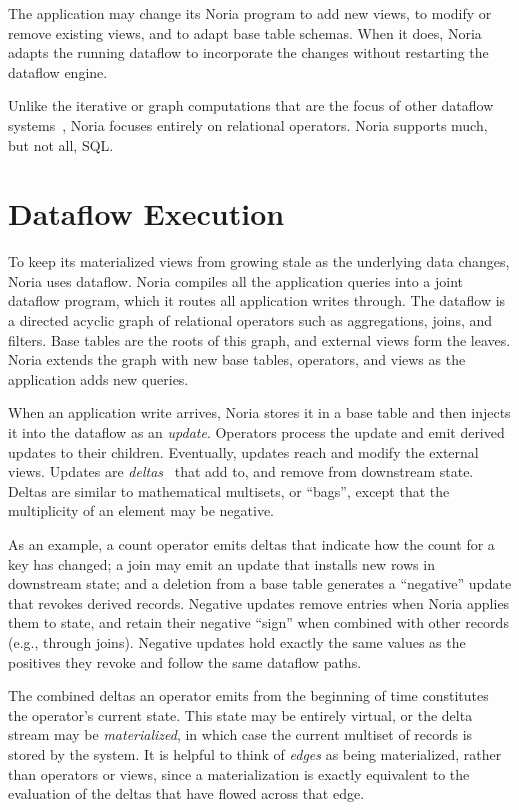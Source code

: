 The application may change its Noria program to add new views, to modify or
remove existing views, and to adapt base table schemas. When it does, Noria
adapts the running dataflow to incorporate the changes without restarting the
dataflow engine.

Unlike the iterative or graph computations that are the focus of other dataflow
systems~\cite{naiad, differential-dataflow}, Noria focuses entirely on
relational operators. Noria supports much, but not all, SQL.

\section{Dataflow Execution}

To keep its materialized views from growing stale as the underlying data
changes, Noria uses dataflow. Noria compiles all the application queries into a
joint dataflow program, which it routes all application writes through. The
dataflow is a directed acyclic graph of relational operators such as
aggregations, joins, and filters. Base tables are the roots of this graph, and
external views form the leaves. Noria extends the graph with new base tables,
operators, and views as the application adds new queries.

When an application write arrives, Noria stores it in a base table and then
injects it into the dataflow as an \emph{update}. Operators process the update
and emit derived updates to their children. Eventually, updates reach and modify
the external views. Updates are \emph{deltas}~\cite{roll, differential-dataflow}
that add to, and remove from downstream state. Deltas are similar to
mathematical multisets, or ``bags'', except that the multiplicity of an element
may be negative.

As an example, a count operator emits deltas that indicate how the count for a
key has changed; a join may emit an update that installs new rows in downstream
state; and a deletion from a base table generates a ``negative'' update that
revokes derived records. Negative updates remove entries when Noria applies them
to state, and retain their negative ``sign'' when combined with other records
(e.g., through joins). Negative updates hold exactly the same values as the
positives they revoke and follow the same dataflow paths.

The combined deltas an operator emits from the beginning of time constitutes the
operator's current state. This state may be entirely virtual, or the delta
stream may be \textit{materialized}, in which case the current multiset of
records is stored by the system. It is helpful to think of \emph{edges} as being
materialized, rather than operators or views, since a materialization is exactly
equivalent to the evaluation of the deltas that have flowed across that edge.

